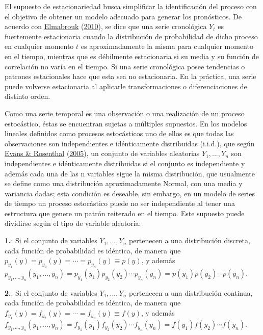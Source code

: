 \documentclass[
]{article}
\begin{document}
El supuesto de estacionariedad busca simplificar la identificación del
proceso con el objetivo de obtener un modelo adecuado para generar los
pronósticos. De acuerdo con
\protect\hyperlink{ref-definicion_estocastico}{Elmabrouk}
(\protect\hyperlink{ref-definicion_estocastico}{2010}), se dice que una
serie cronológica \(Y_t\) es fuertemente estacionaria cuando la
distribución de probabilidad de dicho proceso en cualquier momento \(t\)
es aproximadamente la misma para cualquier momento en el tiempo,
mientras que es débilmente estacionaria si su media y su función de
correlación no varía en el tiempo. Si una serie cronológica posee
tendencias o patrones estacionales hace que esta sea no estacionaria. En
la práctica, una serie puede volverse estacionaria al aplicarle
transformaciones o diferenciaciones de distinto orden.

Como una serie temporal es una observación o una realización de un
proceso estocástico, éstas se encuentran sujetas a múltiples supuestos.
En los modelos lineales definidos como procesos estocásticos uno de
ellos es que todas las observaciones son independientes e idénticamente
distribuidas (i.i.d.), que según
\protect\hyperlink{ref-definicion_iid}{Evans \& Rosenthal}
(\protect\hyperlink{ref-definicion_iid}{2005}), un conjunto de variables
aleatorias \(Y_1,...,Y_n\) son independientes e idénticamente
distribuidas si el conjunto es independiente y además cada una de las n
variables sigue la misma distribución, que usualmente se define como una
distribución aproximadamente Normal, con una media y variancia dadas;
esta condición es deseable, sin embargo, en un modelo de series de
tiempo un proceso estocástico puede no ser independiente al tener una
estructura que genere un patrón reiterado en el tiempo. Este supuesto
puede dividirse según el tipo de variable aleatoria:

\textbf{1.}: Si el conjunto de variables \(Y_1,...,Y_n\) pertenecen a
una distribución discreta, cada función de probabilidad es idéntica, de
manera que \(p_{y_1}(y)=p_{y_2}(y)=\cdots=p_{y_n}(y)\equiv p(y)\), y
además
\(p_{y_1,...,y_n}(y_1,...,y_n)=p_{y_1}(y_1)p_{y_2}(y_2)\cdots p_{y_n}(y_n)=p(y_1)p(y_2)\cdots p(y_n)\).

\textbf{2.}: Si el conjunto de variables \(Y_1,...,Y_n\) pertenecen a
una distribución continua, cada función de probabilidad es idéntica, de
manera que \(f_{y_1}(y)=f_{y_2}(y)=\cdots=f_{y_n}(y)\equiv f(y)\), y
además
\(f_{y_1,...,y_n}(y_1,...,y_n)=f_{y_1}(y_1)f_{y_2}(y_2)\cdots f_{y_n}(y_n)=f(y_1)f(y_2)\cdots f(y_n)\).
\end{document}
